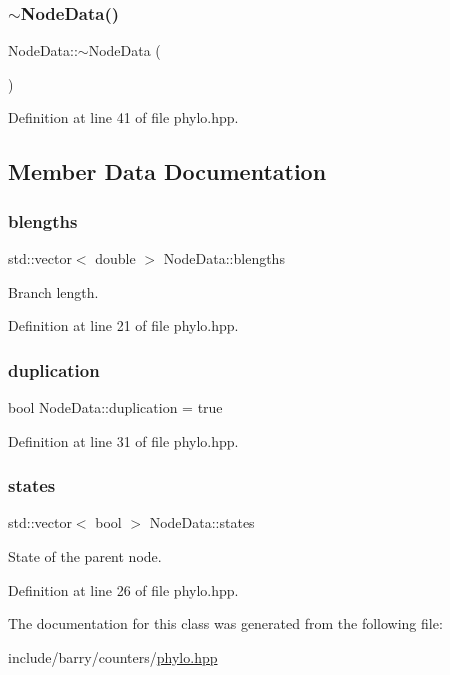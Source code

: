\subsubsection{\texorpdfstring{$\sim$\+Node\+Data()}{~NodeData()}}
{\footnotesize\ttfamily Node\+Data\+::$\sim$\+Node\+Data (\begin{DoxyParamCaption}{ }\end{DoxyParamCaption})\hspace{0.3cm}{\ttfamily [inline]}}



Definition at line 41 of file phylo.\+hpp.



\subsection{Member Data Documentation}
\mbox{\label{class_node_data_a02da5f097c105813216d87ef89ad7bd4}} 
\subsubsection{\texorpdfstring{blengths}{blengths}}
{\footnotesize\ttfamily std\+::vector$<$ double $>$ Node\+Data\+::blengths}

Branch length. 

Definition at line 21 of file phylo.\+hpp.

\mbox{\label{class_node_data_a6c21d52091bb4fa6e3d431856da17caa}} 
\subsubsection{\texorpdfstring{duplication}{duplication}}
{\footnotesize\ttfamily bool Node\+Data\+::duplication = true}



Definition at line 31 of file phylo.\+hpp.

\mbox{\label{class_node_data_a33caaadde6afe892624501bdb0edaea6}} 
\subsubsection{\texorpdfstring{states}{states}}
{\footnotesize\ttfamily std\+::vector$<$ bool $>$ Node\+Data\+::states}

State of the parent node. 

Definition at line 26 of file phylo.\+hpp.



The documentation for this class was generated from the following file\+:\begin{DoxyCompactItemize}
\item 
include/barry/counters/\hyperlink{phylo_8hpp}{phylo.\+hpp}\end{DoxyCompactItemize}
